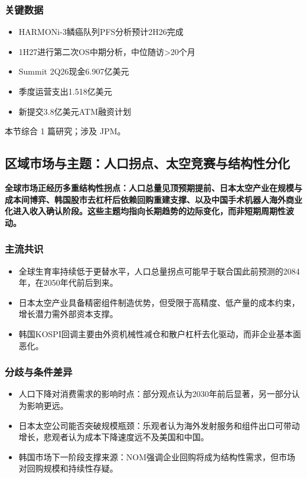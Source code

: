 \documentclass[11pt]{ctexart}
\begin{document}
\subsubsection*{关键数据}
\begin{itemize}
  \item HARMONi-3鳞癌队列PFS分析预计2H26完成
  \item 1H27进行第二次OS中期分析，中位随访>20个月
  \item Summit 2Q26现金6.907亿美元
  \item 季度运营支出1.518亿美元
  \item 新提交3.8亿美元ATM融资计划
\end{itemize}
{\small\color{refgray}本节综合 1 篇研究；涉及 JPM。}
\newpage
\subsection{区域市场与主题：人口拐点、太空竞赛与结构性分化}
\textbf{全球市场正经历多重结构性拐点：人口总量见顶预期提前、日本太空产业在规模与成本间博弈、韩国股市去杠杆后依赖回购重建支撑、以及中国手术机器人海外商业化进入收入确认阶段。这些主题均指向长期趋势的边际变化，而非短期周期性波动。}
\subsubsection*{主流共识}
\begin{itemize}
  \item 全球生育率持续低于更替水平，人口总量拐点可能早于联合国此前预测的2084年，在2050年代前后到来。
  \item 日本太空产业具备精密组件制造优势，但受限于高精度、低产量的成本约束，增长潜力需外部资本支撑。
  \item 韩国KOSPI回调主要由外资机械性减仓和散户杠杆去化驱动，而非企业基本面恶化。
\end{itemize}
\subsubsection*{分歧与条件差异}
\begin{itemize}
  \item 人口下降对消费需求的影响时点：部分观点认为2030年前后显著，另一部分认为影响更远。
  \item 日本太空公司能否突破规模瓶颈：乐观者认为海外发射服务和组件出口可带动增长，悲观者认为成本下降速度远不及美国和中国。
  \item 韩国市场下一阶段支撑来源：NOM强调企业回购将成为结构性需求，但市场对回购规模和持续性存疑。
\end{itemize}
\end{document}

